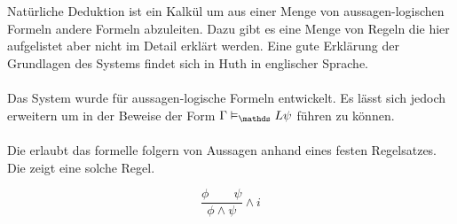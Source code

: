 
\section{\ND} %
\label{sub:natuerliche_folgerung}
Natürliche Deduktion ist ein Kalkül um aus einer Menge von aussagen-logischen Formeln andere Formeln abzuleiten.
Dazu gibt es eine Menge von Regeln die hier aufgelistet aber nicht im Detail erklärt werden.
Eine gute Erklärung der Grundlagen des Systems findet sich in Huth \cite[Kapitel 1.2 (natural deduction)]{huth2004logic} in englischer Sprache.\\
\\
Das System wurde für aussagen-logische Formeln entwickelt. Es lässt sich jedoch erweitern um in der \ML Beweise der Form $\Gamma \vDash_\Menge{L} \psi$ führen zu können.\\

\paragraph{\ND \AL} %
\label{par:natuerliche_deduktion_aussagenlogick}
Die \ND erlaubt das formelle folgern von Aussagen anhand eines festen Regelsatzes.
Die  zeigt eine solche Regel.

\begin{equation}
	\label{eq:iConjunction}
		\frac{\phi \qquad \psi}{\phi \wedge \psi} \wedge i
\end{equation}



